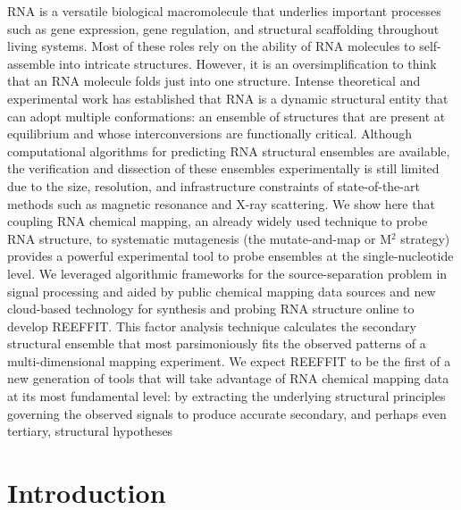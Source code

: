 \documentclass[12pt]{article}
\begin{document}
RNA is a versatile biological macromolecule that underlies important processes such as gene expression, gene regulation, and structural scaffolding throughout living systems. 
Most of these roles rely on the ability of RNA molecules to self-assemble into intricate structures.
However, it is an oversimplification to think that an RNA molecule folds just into one structure. 
Intense theoretical and experimental work has established that RNA is a dynamic structural entity that can adopt multiple conformations: an ensemble of structures that are present at equilibrium and whose interconversions are functionally critical. 
Although computational algorithms for predicting RNA structural ensembles are available, the verification and dissection of these ensembles experimentally is still limited due to the size, resolution, and infrastructure constraints of state-of-the-art methods such as magnetic resonance and X-ray scattering. 
We show here that coupling RNA chemical mapping, an already widely used technique to probe RNA structure, to systematic mutagenesis (the mutate-and-map or M$^2$ strategy) provides a powerful experimental tool to probe ensembles at the single-nucleotide level. 
We leveraged algorithmic frameworks for the source-separation problem in signal processing and aided by public chemical mapping data sources and new cloud-based technology for synthesis and probing RNA structure online to develop REEFFIT. This factor analysis technique calculates the secondary structural ensemble that most parsimoniously fits the observed patterns of a multi-dimensional mapping experiment. 
We expect REEFFIT to be the first of a new generation of tools that will take advantage of RNA chemical mapping data at its most fundamental level: by extracting the underlying structural principles governing the observed signals to produce accurate secondary, and perhaps even tertiary, structural hypotheses


\section{Introduction}
\end{document}
